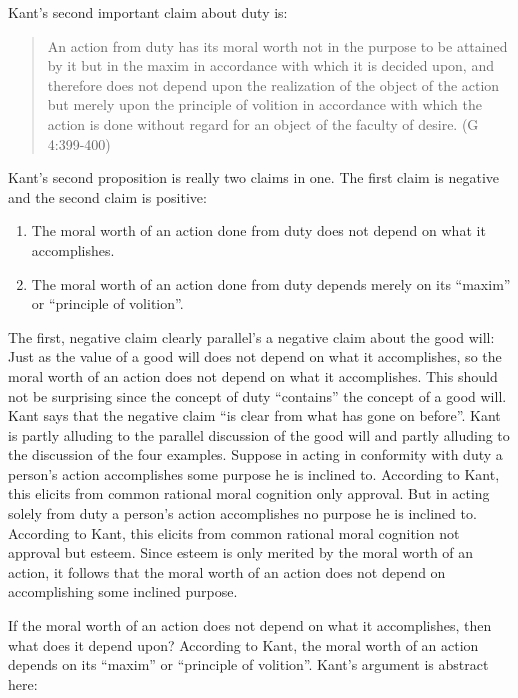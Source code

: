 Kant's second important claim about duty is:

\begin{quote}
	An action from duty has its moral worth not in the purpose to be attained by it but in the maxim in accordance with which it is decided upon, and therefore does not depend upon the realization of the object of the action but merely upon the principle of volition in accordance with which the action is done without regard for an object of the faculty of desire. (G 4:399-400)
\end{quote}

Kant's second proposition is really two claims in one. The first claim is negative and the second claim is positive:

\begin{enumerate}
	\item The moral worth of an action done from duty does not depend on what it accomplishes.
	\item The moral worth of an action done from duty depends merely on its ``maxim'' or ``principle of volition''.
\end{enumerate}

The first, negative claim clearly parallel's a negative claim about the good will: Just as the value of a good will does not depend on what it accomplishes, so the moral worth of an action does not depend on what it accomplishes. This should not be surprising since the concept of duty ``contains'' the concept of a good will. Kant says that the negative claim ``is clear from what has gone on before''. Kant is partly alluding to the parallel discussion of the good will and partly alluding to the discussion of the four examples. Suppose in acting in conformity with duty a person's action accomplishes some purpose he is inclined to. According to Kant, this elicits from common rational moral cognition only approval. But in acting solely from duty a person's action accomplishes no purpose he is inclined to. According to Kant, this elicits from common rational moral cognition not approval but esteem. Since esteem is only merited by the moral worth of an action, it follows that the moral worth of an action does not depend on accomplishing some inclined purpose.

If the moral worth of an action does not depend on what it accomplishes, then what does it depend upon? According to Kant, the moral worth of an action depends on its ``maxim'' or ``principle of volition''. Kant's argument is abstract here:

